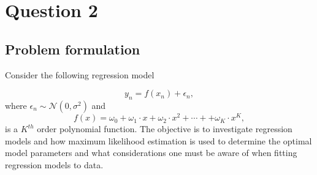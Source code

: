 \documentclass{article}
\begin{document}
\clearpage

\section{Question 2}

\subsection{Problem formulation}
Consider the following regression model

\begin{equation}
y_n = f(x_n) + \epsilon_n,
\end{equation}
where $\epsilon_n \sim \mathcal{N}(0, \sigma^2)$ and
\begin{equation}
f(x) = \omega_0 + \omega_1 \cdot x + \omega_2 \cdot x^2 + \cdots +  + \omega_K \cdot x^K,
\end{equation}
is a $K^{th}$ order polynomial function. The objective is to investigate regression models and how maximum likelihood estimation is used to determine the optimal model parameters and what considerations one must be aware of when fitting regression models to data. 
\end{document}
